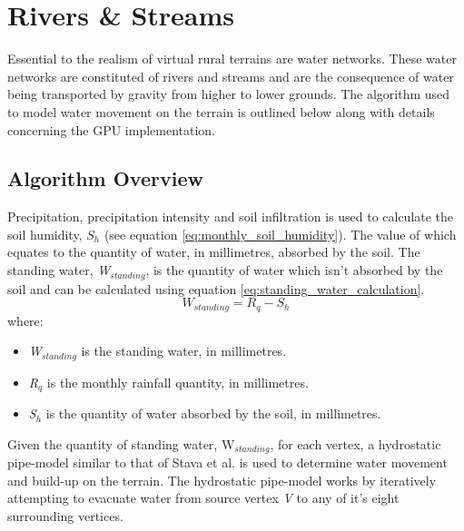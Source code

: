 \section{Rivers \& Streams} \label{sec:rivers_and_streams}

Essential to the realism of virtual rural terrains are water networks. These water networks are constituted of rivers and streams and are the consequence of water being transported by gravity from higher to lower grounds. The algorithm used to model water movement on the terrain is outlined below along with details concerning the GPU implementation.

\subsection{Algorithm Overview}

Precipitation, precipitation intensity and soil infiltration is used to calculate the soil humidity, $S_{h}$ (see equation \ref{eq:monthly_soil_humidity}). The value of which equates to the quantity of water, in millimetres, absorbed by the soil. The standing water, \textit{W$_{standing}$}, is the quantity of water which isn't absorbed by the soil and can be calculated using equation \ref{eq:standing_water_calculation}.\\

\begin{equation} \label{eq:standing_water_calculation}
	W_{standing} = R_{q} - S_{h}
\end{equation}
where:
\begin{itemize}
\item \textit{W$_{standing}$} is the standing water, in millimetres.\\
\item \textit{R$_{q}$} is the monthly rainfall quantity, in millimetres.\\
\item \textit{S$_{h}$} is the quantity of water absorbed by the soil, in millimetres.\\
\end{itemize}

Given the quantity of standing water, W$_{standing}$, for each vertex, a hydrostatic pipe-model similar to that of Stava et al. \cite{StAva2008} is used to determine water movement and build-up on the terrain. The hydrostatic pipe-model works by iteratively attempting to evacuate water from source vertex \textit{V} to any of it's eight surrounding vertices.\\

